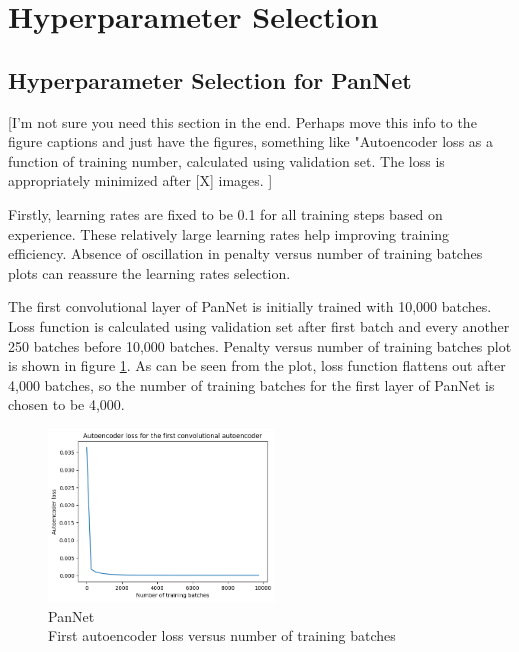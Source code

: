 \section{Hyperparameter Selection}

\subsection{Hyperparameter Selection for PanNet} 


[I'm not sure you need this section in the end. Perhaps move this info to the figure captions and just have the figures, something like "Autoencoder loss as a function of training number, calculated using validation set. The loss is appropriately minimized after [X] images. ] 

Firstly, learning rates are fixed to be 0.1 for all training steps based on experience. These relatively large learning rates help improving training efficiency. Absence of oscillation in penalty versus number of training batches plots can reassure the learning rates selection.  




The first convolutional layer of PanNet is initially trained with 10,000 batches. Loss function is calculated using validation set after first batch and every another 250 batches before 10,000 batches. Penalty versus number of training batches plot is shown in figure \ref{fig:PanNet_search_parameters_1}. As can be seen from the plot, loss function flattens out after 4,000 batches, so the number of training batches for the first layer of PanNet is chosen to be 4,000. 

\begin{figure}[th]
\centering
\includegraphics[width=60mm]{Figures/PanNet_search_parameters_1}
\decoRule
\caption{PanNet\\ First autoencoder loss versus number of training batches}
\label{fig:PanNet_search_parameters_1}
\end{figure}

